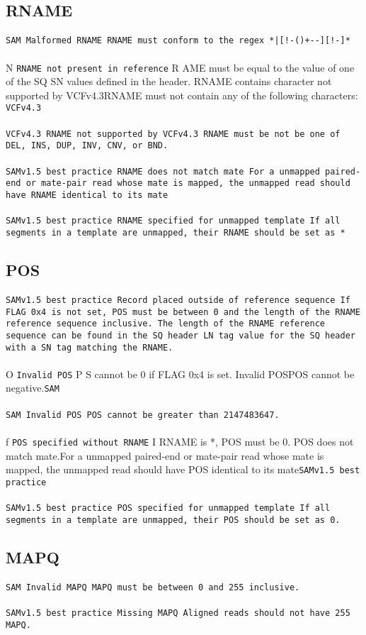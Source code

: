 \documentclass[10pt]{article}
\newcommand{\samrule}{\tt SAM}
\newcommand{\vonefivebestpractice}{\tt SAMv1.5 best practice}
\newcommand{\vcffourthree}{\tt VCFv4.3}
\newcommand{\samstrictrule}[3]{
	\paragraph{} #3
	{\tt #1}
	#2
}
\begin{document}
\subsection{RNAME}
\samstrictrule{Malformed RNAME}{RNAME must conform to the regex {\tt \char92*|[!-()+-\char60\char62-\char126][!-\char126]*}}{\samrule}
\samstrictrule{RNAME not present in reference}{RNAME must be equal to the value of one of the SQ SN values defined in the header.}
\samstrictrule{RNAME contains character not supported by VCFv4.3}{RNAME must not contain any of the following characters: {\tt {}}}{\vcffourthree}
\samstrictrule{RNAME not supported by VCFv4.3}{RNAME must be not be one of {\tt DEL}, {\tt INS}, {\tt DUP}, {\tt INV}, {\tt CNV}, or {\tt BND}.}{\vcffourthree}
\samstrictrule{RNAME does not match mate}{For a unmapped paired-end or mate-pair read whose mate is mapped, the unmapped read should have RNAME identical to its mate}{\vonefivebestpractice}
\samstrictrule{RNAME specified for unmapped template}{If all segments in a template are unmapped, their RNAME should be set as *}{\vonefivebestpractice}


\subsection{POS}
\samstrictrule{Record placed outside of reference sequence}{If FLAG 0x4 is not set, POS must be between 0 and the length of the RNAME reference sequence inclusive. The length of the RNAME reference sequence can be found in the SQ header LN tag value for the SQ header with a SN tag matching the RNAME.}{\vonefivebestpractice}
\samstrictrule{Invalid POS}{POS cannot be 0 if FLAG 0x4 is set.}
\samstrictrule{Invalid POS}{POS cannot be negative.}{\samrule}
\samstrictrule{Invalid POS}{POS cannot be greater than 2147483647.}{\samrule}
\samstrictrule{POS specified without RNAME}{If RNAME is *, POS must be 0.}
\samstrictrule{POS does not match mate.}{For a unmapped paired-end or mate-pair read whose mate is mapped, the unmapped read should have POS identical to its mate}{\vonefivebestpractice}
\samstrictrule{POS specified for unmapped template}{If all segments in a template are unmapped, their POS should be set as 0.}{\vonefivebestpractice}

\subsection{MAPQ}
\samstrictrule{Invalid MAPQ}{MAPQ must be between 0 and 255 inclusive.}{\samrule}
\samstrictrule{Missing MAPQ}{Aligned reads should not have 255 MAPQ.}{\vonefivebestpractice}
\end{document}
